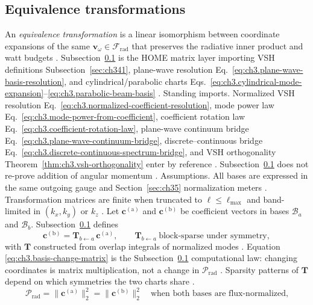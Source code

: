 \subsection{Equivalence transformations}
\label{sec:ch383}
An \emph{equivalence transformation} is a linear isomorphism between coordinate expansions of the same
\(\mathbf{v}_\omega\in\mathcal{F}_{\mathrm{rad}}\) that preserves the radiative inner product and watt budgets
\cite{stratton1941}. Subsection~\ref{sec:ch383} is the HOME matrix layer importing VSH definitions
Subsection~\ref{sec:ch341}, plane-wave resolution Eq.~\eqref{eq:ch3.plane-wave-basis-resolution}, and cylindrical/parabolic charts
Eqs.~\eqref{eq:ch3.cylindrical-mode-expansion}--\eqref{eq:ch3.parabolic-beam-basis} \cite{jackson1999}.
Standing imports. Normalized VSH resolution Eq.~\eqref{eq:ch3.normalized-coefficient-resolution}, mode power law
Eq.~\eqref{eq:ch3.mode-power-from-coefficient}, coefficient rotation law Eq.~\eqref{eq:ch3.coefficient-rotation-law},
plane-wave continuum bridge Eq.~\eqref{eq:ch3.plane-wave-continuum-bridge}, discrete--continuous bridge
Eq.~\eqref{eq:ch3.discrete-continuous-spectrum-bridge}, and VSH orthogonality Theorem~\ref{thm:ch3.vsh-orthogonality} enter by
reference \cite{hansen1988}. Subsection~\ref{sec:ch383} does not re-prove addition of angular momentum
\cite{jackson1999}.
Assumptions. All bases are expressed in the same outgoing gauge and Section~\ref{sec:ch35} normalization meters \cite{hansen1988}.
Transformation matrices are finite when truncated to \(\ell\le\ell_{\max}\) and band-limited in \((k_{x},k_{y})\) or \(k_{z}\)
\cite{stratton1941}.
Let \(\mathbf{c}^{(\mathrm{a})}\) and \(\mathbf{c}^{(\mathrm{b})}\) be coefficient vectors in bases \(\mathcal{B}_{a}\) and
\(\mathcal{B}_{b}\). Subsection~\ref{sec:ch383} defines
\begin{equation}
\label{eq:ch3.basis-change-matrix}
\mathbf{c}^{(\mathrm{b})}
=
\mathbf{T}_{b\leftarrow a}\,\mathbf{c}^{(\mathrm{a})},
\qquad
\mathbf{T}_{b\leftarrow a}\ \text{block-sparse under symmetry},
\end{equation}
with \(\mathbf{T}\) constructed from overlap integrals of normalized modes \cite{hansen1988}. Equation
\eqref{eq:ch3.basis-change-matrix} is the Subsection~\ref{sec:ch383} computational law: changing coordinates is matrix multiplication,
not a change in \(\mathcal{P}_{\mathrm{rad}}\) \cite{poynting1884}. Sparsity patterns of \(\mathbf{T}\) depend on which
symmetries the two charts share \cite{jackson1999}.
\begin{equation}
\label{eq:ch3.power-invariance-basis-change}
\mathcal{P}_{\mathrm{rad}}
=
\|\mathbf{c}^{(\mathrm{a})}\|_{2}^{2}
=
\|\mathbf{c}^{(\mathrm{b})}\|_{2}^{2}
\quad\text{when both bases are flux-normalized,}
\end{equation}
